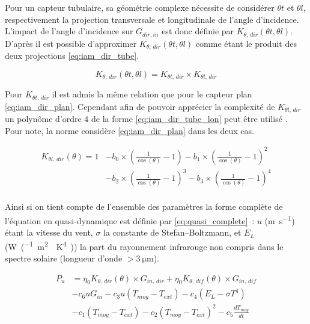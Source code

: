 Pour un capteur tubulaire, sa géométrie complexe nécessite de considérer $\theta t$ et
$\theta l$, respectivement la projection transversale et longitudinale de l’angle
d’incidence. L’impact de l’angle d’incidence sur $G_{dir, in}$ est donc définie par
$K_{\theta,\,dir} (\theta t, \theta l)$. D’après \textcite{McIntire1982315} il est possible
d’approximer $K_{\theta,\,dir} (\theta t, \theta l)$ comme étant le produit des deux
projections \eqref{eq:iam_dir_tube}.

\begin{equation}\label{eq:iam_dir_tube}
    K_{\theta,\,dir} (\theta t, \theta l) = K_{\theta t,\,dir} \times K_{\theta l,\,dir}
\end{equation}

Pour $K_{\theta t,\,dir}$ il est admis la même relation que pour le capteur plan \eqref{eq:iam_dir_plan}.
Cependant afin de pouvoir apprécier la complexité de $K_{\theta l,\,dir}$ un polynôme d’ordre
$4$ de la forme \eqref{eq:iam_dir_tube_lon} peut être utilisé \parencite{Zambolin201237}.
Pour note, la norme considère \eqref{eq:iam_dir_plan} dans les deux cas.

\begin{align}\label{eq:iam_dir_tube_lon}
    K_{\theta l,\,dir} (\theta) = 1 &- b_{0} \times \left(\frac{1}{\cos(\theta)} - 1\right)
                          - b_{1} \times \left(\frac{1}{\cos(\theta)} - 1\right)^{2} \\
                          &- b_{2} \times \left(\frac{1}{\cos(\theta)} - 1\right)^{3}
                          - b_{3} \times \left(\frac{1}{\cos(\theta)} - 1\right)^{4} \\
\end{align}

Ainsi si on tient compte de l’ensemble des paramètres la forme complète de l’équation
en quasi-dynamique est définie par \eqref{eq:quasi_complete}~: $u$ (\si{\metre\per\second})
étant la vitesse du vent, $\sigma$ la constante de Stefan–Boltzmann, et $E_{L}$
(\si{W\per(\metre\squared\period\kelvin^{4})}) la part du rayonnement infrarouge
non compris dans le spectre solaire (longueur d’onde $> \SI{3}{\micro\metre}$).


\begin{align}\label{eq:quasi_complete}
        P_{u}  &= \eta_{0} K_{\theta,\,dir}(\theta) \times G_{in,\,dir} +
                  \eta_{0} K_{\theta,\,dif}(\theta) \times G_{in,\,dif} \\
                &- c_{6}uG_{in} - c_{3} u(T_{moy} - T_{ext}) - c_{4} (E_{L} - \sigma T^{4}) \\
                &- c_{1} (T_{moy} - T_{ext}) - c_{2} (T_{moy} - T_{ext})^{2} - c_{5}\frac{dT_{moy}}{dt}
\end{align}


